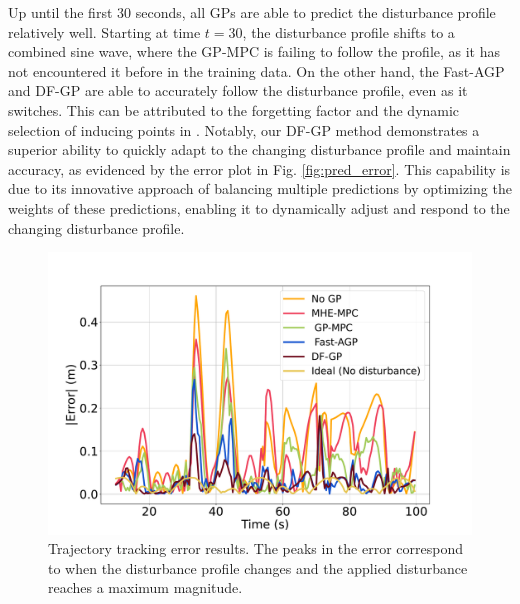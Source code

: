  Up until the first 30 seconds, all  \ac{GP}s are able to predict the disturbance profile relatively well. Starting at time $t=30$, the disturbance profile shifts to a combined sine wave, where the GP-MPC \cite{mohit_gp} is failing to follow the profile, as it has not encountered it before in the training data. On the other hand, the Fast-AGP and \ac{DF-GP} are able to accurately follow the disturbance profile, even as it switches. This can be attributed to the forgetting factor and the dynamic selection of inducing points in \cite{asgp}. Notably, our \ac{DF-GP} method demonstrates a superior ability to quickly adapt to the changing disturbance profile and maintain accuracy, as evidenced by the error plot in Fig. \ref{fig:pred_error}. This capability is due to its innovative approach of balancing multiple predictions by optimizing the weights of these predictions, enabling it to dynamically adjust and respond to the changing disturbance profile.








\begin{figure}[t]
	\centering	\includegraphics[width=0.6\linewidth]{figures/traj_err_mhe.pdf}
	\caption{Trajectory tracking error results. The peaks in the error correspond to when the disturbance profile changes and the applied disturbance reaches a maximum magnitude.} %
	\label{fig:traj_error}
\end{figure}








